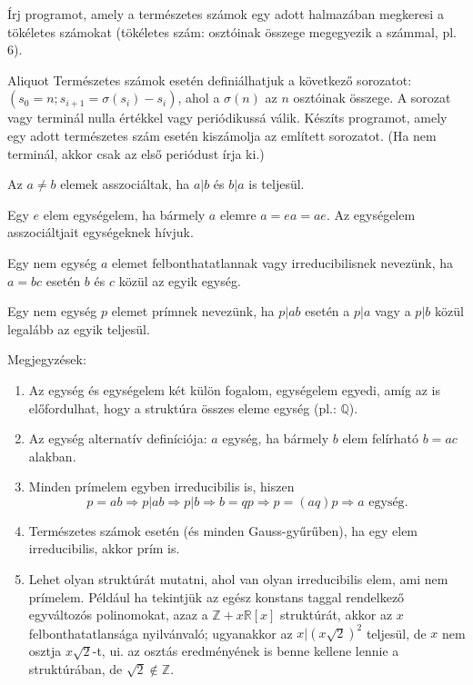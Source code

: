 \begin{exercise} Írj programot, amely a természetes számok egy adott
  halmazában megkeresi a tökéletes számokat (tökéletes szám: osztóinak
  összege megegyezik a számmal, pl. 6).
\end{exercise}

\begin{exercise}{Aliquot} Természetes számok esetén definiálhatjuk a következő
  sorozatot: $(s_0 = n; s_{i+1} = \sigma(s_i) - s_i)$, ahol a $\sigma(n)$
  az $n$ osztóinak összege. A sorozat vagy terminál nulla értékkel vagy
  periódikussá válik. Készíts programot, amely egy adott természetes szám
  esetén kiszámolja az említett sorozatot. (Ha nem terminál, akkor csak az
  első periódust írja ki.)
\end{exercise}

\begin{definition}[Asszociált] Az $a\neq b$ elemek asszociáltak, ha $a|b$ és
  $b|a$ is teljesül.
\end{definition}

\begin{definition}[Egység] Egy $e$ elem egységelem, ha bármely $a$ elemre
  $a=ea=ae$. Az egységelem asszociáltjait egységeknek hívjuk.
\end{definition}

\begin{definition}[Irreducibilis] Egy nem egység $a$ elemet felbonthatatlannak vagy
  irreducibilisnek nevezünk, ha $a=bc$ esetén $b$ és $c$ közül az
  egyik egység.
\end{definition}

\begin{definition}[Prím] Egy nem egység $p$ elemet prímnek nevezünk, ha $p|ab$
  esetén a $p|a$ vagy a $p|b$ közül legalább az egyik teljesül.
\end{definition}

Megjegyzések:
\begin{enumerate}
  \item Az egység és egységelem két külön fogalom, egységelem egyedi,
    amíg az is előfordulhat, hogy a struktúra összes eleme egység (pl.: $\mathbb{Q}$).
  \item Az egység alternatív definíciója: $a$ egység, ha bármely $b$ elem
    felírható $b=ac$ alakban.
  \item Minden prímelem egyben irreducibilis is, hiszen \[
      p = ab \Rightarrow p|ab \Rightarrow p|b \Rightarrow b = qp \Rightarrow
      p = (aq)p \Rightarrow a \text{ egység}.
    \]
  \item Természetes számok esetén (és minden Gauss-gy\H ur\H uben), ha egy
    elem irreducibilis, akkor prím is.
  \item Lehet olyan struktúrát mutatni, ahol van olyan irreducibilis elem,
    ami nem prímelem. Például ha tekintjük az egész konstans taggal rendelkező
    egyváltozós polinomokat, azaz a $\mathbb{Z} + x\mathbb{R}[x]$ struktúrát,
    akkor az $x$ felbonthatatlansága nyilvánvaló; ugyanakkor az
    $x|(x\sqrt{2})^2$ teljesül, de $x$ nem osztja $x\sqrt{2}$-t, ui. az
    osztás eredményének is benne kellene lennie a struktúrában, de
    $\sqrt{2}\notin\mathbb{Z}$.
\end{enumerate}

